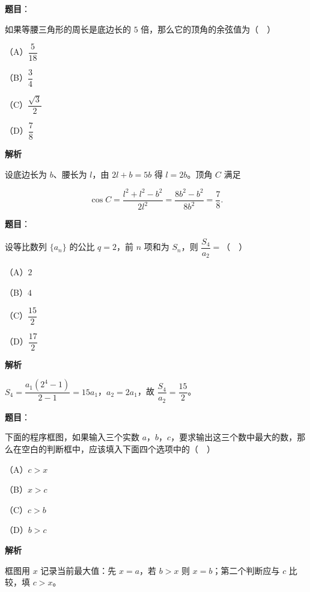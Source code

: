 \begin{answer}

\textbf{题目}：

如果等腰三角形的周长是底边长的 $5$ 倍，那么它的顶角的余弦值为（　）

（A）$\dfrac5{18}$

（B）$\dfrac34$

（C）$\dfrac{\sqrt3}2$

（D）$\dfrac78$

\textbf{解析}

设底边长为 $b$、腰长为 $l$，由 $2l+b=5b$ 得 $l=2b$。顶角 $C$ 满足

\nopagebreak[4]
\[\cos C=\frac{l^2+l^2-b^2}{2l^2}=\frac{8b^2-b^2}{8b^2}=\frac78.\]


\end{answer}
\begin{answer}

\textbf{题目}：

设等比数列 $\{a_n\}$ 的公比 $q=2$，前 $n$ 项和为 $S_n$，则 $\dfrac{S_4}{a_2}=$（　）

（A）$2$

（B）$4$

（C）$\dfrac{15}2$

（D）$\dfrac{17}2$

\textbf{解析}

$S_4=\dfrac{a_1(2^4-1)}{2-1}=15a_1$，$a_2=2a_1$，故 $\dfrac{S_4}{a_2}=\dfrac{15}2$。


\end{answer}
\begin{answer}

\textbf{题目}：

下面的程序框图，如果输入三个实数 $a$，$b$，$c$，要求输出这三个数中最大的数，那么在空白的判断框中，应该填入下面四个选项中的（　）

（A）$c>x$

（B）$x>c$

（C）$c>b$

（D）$b>c$
\nopagebreak[4]
\begin{center}\end{center}
\nopagebreak[4]
\textbf{解析}

框图用 $x$ 记录当前最大值：先 $x=a$，若 $b>x$ 则 $x=b$；第二个判断应与 $c$ 比较，填 $c>x$。


\end{answer}
